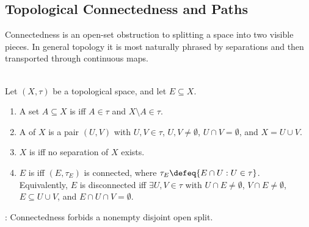 \subsection{Topological Connectedness and Paths}

Connectedness is an open-set obstruction to splitting a space into two visible pieces. In general topology it is most naturally phrased by separations and then transported through continuous maps.

\begin{definition} \label{def:topological-connectedness} \\
Let $(X,\tau)$ be a topological space, and let $E\subseteq X$.
\begin{enumerate}[label=(\roman*)]
\setlength{\itemsep}{0pt}
\item A set $A\subseteq X$ is  iff $A\in\tau$ and $X\setminus A\in\tau$.
\item A  of $X$ is a pair $(U,V)$ with $U,V\in\tau$, $U,V\neq\emptyset$, $U\cap V=\emptyset$, and $X=U\cup V$.
\item $X$ is  iff no separation of $X$ exists.
\item $E$ is  iff $(E,\tau_E)$ is connected, where $\tau_E\defeq\{E\cap U:U\in\tau\}$.\\
Equivalently, $E$ is disconnected iff $\exists U,V\in\tau$ with $U\cap E\neq\emptyset$, $V\cap E\neq\emptyset$, $E\subseteq U\cup V$, and $E\cap U\cap V=\emptyset$.
\end{enumerate}
: Connectedness forbids a nonempty disjoint open split.
\end{definition}


